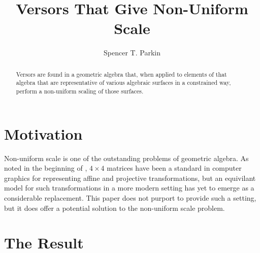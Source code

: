 \documentclass{birkjour}
\theoremstyle{definition}
\theoremstyle{remark}
\numberwithin{equation}{section}
\begin{document}
\title{Versors That Give Non-Uniform Scale}

\author{Spencer T. Parkin}
\address{102 W. 500 S., \\
Salt Lake City, UT  84101} 



\begin{abstract}
Versors are found in a geometric algebra that,
when applied to elements of that algebra that are representative
of various algebraic surfaces in a constrained way, perform a non-uniform scaling
of those surfaces.
\end{abstract}


\maketitle

\section{Motivation}

Non-uniform scale is one of the outstanding problems of geometric algebra.
As noted in the beginning of \cite{Goldman}, $4\times 4$ matrices have been a standard
in computer graphics for representing affine and projective transformations, but an
equivilant model for such transformations in a more modern setting has yet to emerge
as a considerable replacement.  This paper does not purport to provide such a setting,
but it does offer a potential solution to the non-uniform scale problem.

\section{The Result}
\end{document}
